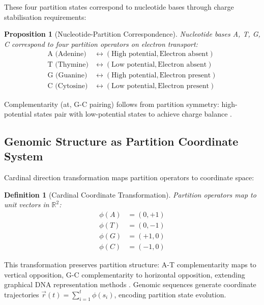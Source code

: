 \documentclass[11pt,a4paper]{article}
\newtheorem{definition}[theorem]{Definition}
\newtheorem{proposition}[theorem]{Proposition}
\theoremstyle{remark}
\begin{document}
These four partition states correspond to nucleotide bases through charge stabilisation requirements:

\begin{proposition}[Nucleotide-Partition Correspondence]
\label{prop:nucleotide_partition}
Nucleotide bases A, T, G, C correspond to four partition operators on electron transport:
\begin{align}
\text{A (Adenine)} &\leftrightarrow (\text{High potential}, \text{Electron absent}) \\
\text{T (Thymine)} &\leftrightarrow (\text{Low potential}, \text{Electron absent}) \\
\text{G (Guanine)} &\leftrightarrow (\text{High potential}, \text{Electron present}) \\
\text{C (Cytosine)} &\leftrightarrow (\text{Low potential}, \text{Electron present})
\end{align}
\end{proposition}

Complementarity (at, G-C pairing) follows from partition symmetry: high-potential states pair with low-potential states to achieve charge balance \citep{watson1953molecular, travers2015dna}.

\subsection{Genomic Structure as Partition Coordinate System}

Cardinal direction transformation maps partition operators to coordinate space:

\begin{definition}[Cardinal Coordinate Transformation]
\label{def:cardinal_transform}
Partition operators map to unit vectors in $\mathbb{R}^2$:
\begin{align}
\phi(A) &= (0, +1) \\
\phi(T) &= (0, -1) \\
\phi(G) &= (+1, 0) \\
\phi(C) &= (-1, 0)
\end{align}
\end{definition}

This transformation preserves partition structure: A-T complementarity maps to vertical opposition, G-C complementarity to horizontal opposition, extending graphical DNA representation methods \citep{nandy2006graphical, randic2003novel, yau2003dna}. Genomic sequences generate coordinate trajectories $\vec{r}(t) = \sum_{i=1}^t \phi(s_i)$, encoding partition state evolution.
\end{document}
